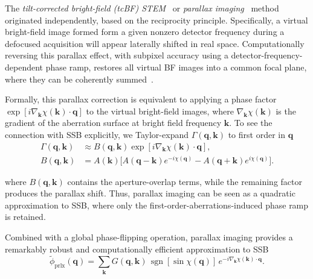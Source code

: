 \documentclass[pdflatex,sn-aps,iicol]{sn-jnl}%
\begin{document}
The \emph{tilt-corrected bright-field (tcBF) STEM}~\cite{Nguyen_2016,Spoth_2017,Yu_2025} or \emph{parallax imaging}~\cite{Varnavides_2023,Varnavides_2024,Varnavides_2025} method originated independently, based on the reciprocity principle.
Specifically, a virtual bright-field image formed form a given nonzero detector frequency during a defocused acquisition will appear laterally shifted in real space.
Computationally reversing this parallax effect, with subpixel accuracy using a detector-frequency-dependent phase ramp, restores all virtual BF images into a common focal plane, where they can be coherently summed~\cite{Yu_2025,Varnavides_2025}.

Formally, this parallax correction is equivalent to applying a phase factor $\exp[i \nabla_{\boldsymbol{k}} \chi(\boldsymbol{k}) \cdot \boldsymbol{q}]$ to the virtual bright-field images, where $\nabla_{\boldsymbol{k}} \chi(\boldsymbol{k})$ is the gradient of the aberration surface at bright field frequency $\boldsymbol{k}$.
To see the connection with SSB explicitly, we Taylor-expand $\Gamma(\boldsymbol{q},\boldsymbol{k})$ to first order in $\boldsymbol{q}$
\begin{align}
\Gamma(\boldsymbol{q},\boldsymbol{k})
&\approx
B(\boldsymbol{q},\boldsymbol{k})
\exp\!\left[i\nabla_{\boldsymbol{k}}\chi(\boldsymbol{k})\cdot\boldsymbol{q}\right],
\\
B(\boldsymbol{q},\boldsymbol{k})
&=
A(\boldsymbol{k})
\Big[
A(\boldsymbol{q}-\boldsymbol{k})e^{-i\chi(\boldsymbol{q})}
-
A(\boldsymbol{q}+\boldsymbol{k})e^{i\chi(\boldsymbol{q})}
\Big].
\label{eq:prlx-gamma-approx}
\end{align}

where $B(\boldsymbol{q},\boldsymbol{k})$ contains the aperture-overlap terms, while the remaining factor produces the parallax shift.
Thus, parallax imaging can be seen as a quadratic approximation to SSB, where only the first-order-aberrations-induced phase ramp is retained.

Combined with a global phase-flipping operation, parallax imaging provides a remarkably robust and computationally efficient approximation to SSB~\cite{Varnavides_2025}
\begin{equation}
\tilde{\phi}_{\text{prlx}}(\boldsymbol{q})
=
\sum_{\boldsymbol{k}}
G(\boldsymbol{q},\boldsymbol{k})
\,\operatorname{sgn}[\sin\chi(\boldsymbol{q})]\,
e^{-i\nabla_{\boldsymbol{k}}\chi(\boldsymbol{k})\cdot\boldsymbol{q}} .
\label{eq:par-recon}
\end{equation}
\end{document}
